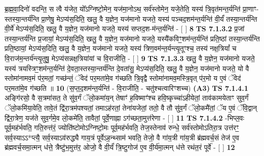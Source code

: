 \documentclass[17pt]{extarticle}
\begin{document}
                  ब्र॒ह्म॒वा॒दिनो॑ वदन्ति॒ स त्वै य॑जेत॒ यो᳚ऽग्निष्टो॒मेन॒ यज॑मा॒नोऽथ॒ सर्व॑स्तोमेन॒ यजे॒तेति॒ यस्य॑ त्रि॒वृत॑मन्त॒र्यन्ति॑ प्रा॒णाꣳ-स्तस्या॒न्तर्य॑न्ति प्रा॒णेषु॒ मेऽप्य॑स॒दिति॒ खलु॒ वै य॒ज्ञेन॒ यज॑मानो यजते॒ यस्य॑ पञ्चद॒शम॑न्त॒र्यन्ति॑ वी॒र्यं॑ तस्या॒न्तर्य॑न्ति वी॒र्ये॑ मेऽप्य॑स॒दिति॒ खलु॒ वै य॒ज्ञेन॒ यज॑मानो यजते॒ यस्य॑ सप्तद॒श-म॑न्त॒र्यन्ति॑ - [  ] \textbf{  8} \newline
                  \newline
                                \textbf{ TS 7.1.3.2} \newline
                  प्र॒जां तस्या॒न्तर्य॑न्ति प्र॒जायां॒ मेऽप्य॑स॒दिति॒ खलु॒ वै य॒ज्ञेन॒ यज॑मानो यजते॒ यस्यै॑कविꣳ॒॒शम॑न्त॒र्यन्ति॑ प्रति॒ष्ठां तस्या॒न्तर्य॑न्ति प्रति॒ष्ठायां॒ मेऽप्य॑स॒दिति॒ खलु॒ वै य॒ज्ञेन॒ यज॑मानो यजते॒ यस्य॑ त्रिण॒वम॑न्त॒र्यन्त्यृ॒तूꣳश्च॒ तस्य॑ नक्ष॒त्रियां᳚ च वि॒राज॑म॒न्तर्य॑न्त्यृ॒तुषु॒ मेऽप्य॑सन्नक्ष॒त्रिया॑यां च वि॒राजीति॒ - [  ] \textbf{  9} \newline
                  \newline
                                \textbf{ TS 7.1.3.3} \newline
                  खलु॒ वै य॒ज्ञेन॒ यज॑मानो यजते॒ यस्य॑ त्रयस्त्रिꣳ॒॒शम॑न्त॒र्यन्ति॑ दे॒वता॒स्तस्या॒न्तर्य॑न्ति दे॒वता॑सु॒ मेऽप्य॑स॒दिति॒ खलु॒ वै य॒ज्ञेन॒ यज॑मानो यजते॒ यो वै स्तोमा॑नामव॒मं प॑र॒मतां॒ गच्छ॑न्तं॒ ॅवेद॑ पर॒मता॑मे॒व ग॑च्छति त्रि॒वृद्वै स्तोमा॑नामव॒मस्त्रि॒वृत् प॑र॒मो य ए॒वं ॅवेद॑ पर॒मता॑मे॒व ग॑च्छति ॥ \textbf{  10} \newline
                  \newline
                      (स॒प्त॒द॒शम॑न्त॒र्यन्ति॑ - वि॒राजीति॒ - चतु॑श्चत्वारिꣳशच्च)  \textbf{(A3)} \newline \newline
                                        \textbf{ TS 7.1.4.1} \newline
                  अङ्गि॑रसो॒ वै स॒त्रमा॑सत॒ ते सु॑व॒र्गं ॅलो॒कमा॑य॒न् तेषाꣳ॑ ह॒विष्माꣳ॑श्च हवि॒ष्कृच्चा॑ऽहीयेतां॒ ताव॑कामयेताꣳ सुव॒र्गं ॅलो॒कमि॑या॒वेति॒ तावे॒तं द्वि॑रा॒त्रम॑पश्यतां॒ तमाऽह॑रतां॒ तेना॑यजेतां॒ ततो॒ वै तौ सु॑व॒र्गं ॅलो॒कमै॑तां॒ ॅय ए॒वं ॅवि॒द्वान् द्वि॑रा॒त्रेण॒ यज॑ते सुव॒र्गमे॒व लो॒कमे॑ति॒ तावैतां॒ पूर्वे॒णाह्ना ऽग॑च्छता॒मुत्त॑रेणा - [  ] \textbf{  11} \newline
                  \newline
                                \textbf{ TS 7.1.4.2} \newline
                  -भिप्ल॒वः पूर्व॒मह॑र्भवति॒ गति॒रुत्त॑रं॒ ज्योति॑ष्टोमोऽग्निष्टो॒मः पूर्व॒मह॑र्भवति॒ तेज॒स्तेनाव॑ रुन्धे॒ सर्व॑स्तोमोऽतिरा॒त्र उत्त॑रꣳ॒॒ सर्व॒स्याऽऽ*प्त्यै॒ सर्व॒स्याऽव॑रुद्ध्यै गाय॒त्रं पूर्वेऽह॒न्थ्साम॑ भवति॒ तेजो॒ वै गा॑य॒त्री गा॑य॒त्री ब्र॑ह्मवर्च॒सं तेज॑ ए॒व ब्र॑ह्मवर्च॒समा॒त्मन् ध॑त्ते॒ त्रैष्टु॑भ॒मुत्त॑र॒ ओजो॒ वै वी॒र्यं॑ त्रि॒ष्टुगोज॑ ए॒व वी॒र्य॑मा॒त्मन् ध॑त्ते रथंत॒रं पूर्वे॑ - [  ] \textbf{  12} \newline
\end{document}
